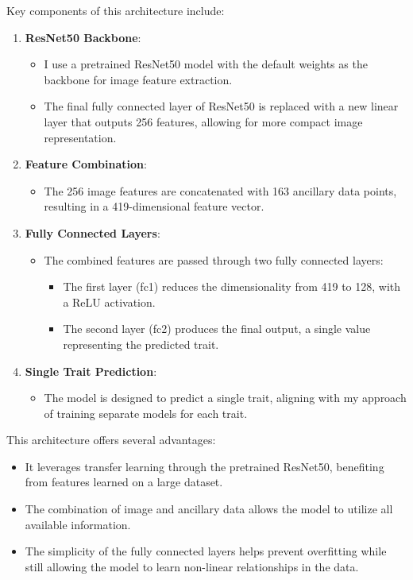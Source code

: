 \documentclass{article}
\begin{document}
Key components of this architecture include:
\begin{enumerate}
    \item \textbf{ResNet50 Backbone}: 
    \begin{itemize}
        \item I use a pretrained ResNet50 model with the default weights as the backbone for image feature extraction.
        \item The final fully connected layer of ResNet50 is replaced with a new linear layer that outputs 256 features, allowing for more compact image representation.
    \end{itemize}
    
    \item \textbf{Feature Combination}:
    \begin{itemize}
        \item The 256 image features are concatenated with 163 ancillary data points, resulting in a 419-dimensional feature vector.
    \end{itemize}
    
    \item \textbf{Fully Connected Layers}:
    \begin{itemize}
        \item The combined features are passed through two fully connected layers:
        \begin{itemize}
            \item The first layer (fc1) reduces the dimensionality from 419 to 128, with a ReLU activation.
            \item The second layer (fc2) produces the final output, a single value representing the predicted trait.
        \end{itemize}
    \end{itemize}
    
    \item \textbf{Single Trait Prediction}:
    \begin{itemize}
        \item The model is designed to predict a single trait, aligning with my approach of training separate models for each trait.
    \end{itemize}
\end{enumerate}

This architecture offers several advantages:
\begin{itemize}
    \item It leverages transfer learning through the pretrained ResNet50, benefiting from features learned on a large dataset.
    \item The combination of image and ancillary data allows the model to utilize all available information.
    \item The simplicity of the fully connected layers helps prevent overfitting while still allowing the model to learn non-linear relationships in the data.
\end{itemize}
\end{document}
